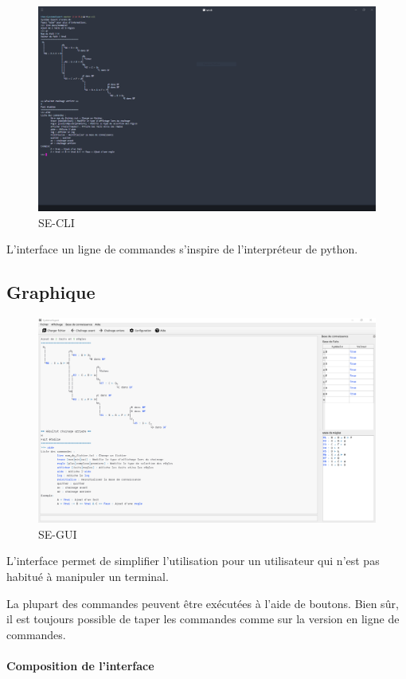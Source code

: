 \documentclass[a4paper, 11pt]{article}
\begin{document}
\begin{figure}[H]
    \centering
    \includegraphics[width=12cm]{cli.png}
    \caption{\label{cli} SE-CLI}
\end{figure}

L'interface un ligne de commandes s'inspire de l'interpréteur de python.

\subsection{Graphique}

\begin{figure}[H]
    \centering
    \includegraphics[width=12cm]{gui.png}
    \caption{\label{gui} SE-GUI}
\end{figure}

L'interface permet de simplifier l'utilisation pour un utilisateur qui n'est pas habitué à manipuler un terminal.

La plupart des commandes peuvent être exécutées à l'aide de boutons. Bien sûr, il est toujours possible de taper les commandes comme sur la version en ligne de commandes.

\paragraph{Composition de l'interface}
\end{document}
